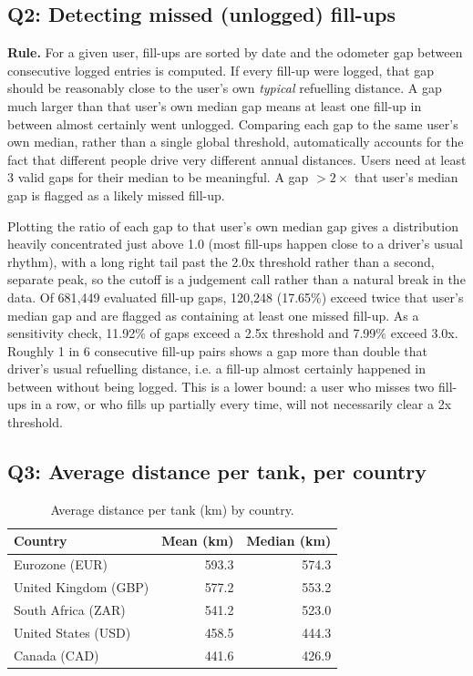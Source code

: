 \documentclass{article}
\begin{document}
\subsection{Q2: Detecting missed (unlogged) fill-ups}
\label{sec:4.2.2}

\textbf{Rule.} For a given user, fill-ups are sorted by date and the odometer gap
between consecutive logged entries is computed. If every fill-up were logged, that gap
should be reasonably close to the user's own \emph{typical} refuelling distance. A gap
much larger than that user's own median gap means at least one fill-up in between almost
certainly went unlogged. Comparing each gap to the same user's own median, rather than a
single global threshold, automatically accounts for the fact that different people drive
very different annual distances. Users need at least 3 valid gaps for their median to be
meaningful. A gap $>2\times$ that user's median gap is flagged as a likely missed
fill-up.

Plotting the ratio of each gap to that user's own median gap gives a distribution
heavily concentrated just above 1.0 (most fill-ups happen close to a driver's usual
rhythm), with a long right tail past the 2.0x threshold rather than a second, separate
peak, so the cutoff is a judgement call rather than a natural break in the data. Of
681{,}449 evaluated fill-up gaps, 120{,}248 (17.65\%) exceed twice that user's median
gap and are flagged as containing at least one missed fill-up. As a sensitivity check,
11.92\% of gaps exceed a 2.5x threshold and 7.99\% exceed 3.0x. Roughly 1 in 6
consecutive fill-up pairs shows a gap more than double that driver's usual refuelling
distance, i.e. a fill-up almost certainly happened in between without being logged.
This is a lower bound: a user who misses two fill-ups in a row, or who fills up
partially every time, will not necessarily clear a 2x threshold.

\subsection{Q3: Average distance per tank, per country}
\label{sec:4.2.3}

\begin{table}[h]
  \caption{Average distance per tank (km) by country.}
  \label{tab:q3}
  \centering
  \begin{tabular}{lrr}
    \toprule
    Country & Mean (km) & Median (km) \\
    \midrule
    Eurozone (EUR) & 593.3 & 574.3 \\
    United Kingdom (GBP) & 577.2 & 553.2 \\
    South Africa (ZAR) & 541.2 & 523.0 \\
    United States (USD) & 458.5 & 444.3 \\
    Canada (CAD) & 441.6 & 426.9 \\
    \bottomrule
  \end{tabular}
\end{table}
\end{document}
